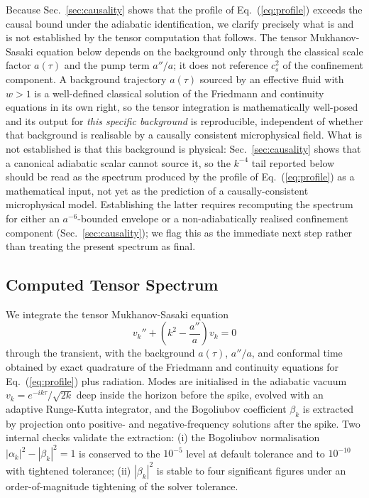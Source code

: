 \documentclass[reprint,superscriptaddress,amsmath,amssymb,aps,prd,showkeys,nofootinbib]{revtex4-2}
\begin{document}
Because Sec.~\ref{sec:causality} shows that the profile of Eq.~(\ref{eq:profile}) exceeds
the causal bound under the adiabatic identification, we clarify precisely what is and is not
established by the tensor computation that follows. The tensor Mukhanov-Sasaki equation
below depends on the background only through the classical scale factor $a(\tau)$ and the
pump term $a''/a$; it does not reference $c_s^2$ of the confinement component. A background
trajectory $a(\tau)$ sourced by an effective fluid with $w>1$ is a well-defined classical
solution of the Friedmann and continuity equations in its own right, so the tensor
integration is mathematically well-posed and its output for \emph{this specific background}
is reproducible, independent of whether that background is realisable by a causally
consistent microphysical field. What is not established is that this background is
physical: Sec.~\ref{sec:causality} shows that a canonical adiabatic scalar cannot source it,
so the $k^{-4}$ tail reported below should be read as the spectrum produced by the profile of
Eq.~(\ref{eq:profile}) as a mathematical input, not yet as the prediction of a
causally-consistent microphysical model. Establishing the latter requires recomputing the
spectrum for either an $a^{-6}$-bounded envelope or a non-adiabatically realised confinement
component (Sec.~\ref{sec:causality}); we flag this as the immediate next step rather than
treating the present spectrum as final.

\subsection{Computed Tensor Spectrum}
\label{sec:tensor}

We integrate the tensor Mukhanov-Sasaki equation
\begin{equation}
v_k'' + \left(k^2 - \frac{a''}{a}\right)v_k = 0
\end{equation}
through the transient, with the background $a(\tau)$, $a''/a$, and conformal time obtained
by exact quadrature of the Friedmann and continuity equations for
Eq.~(\ref{eq:profile}) plus radiation. Modes are initialised in the adiabatic vacuum
$v_k=e^{-ik\tau}/\sqrt{2k}$ deep inside the horizon before the spike, evolved with an
adaptive Runge-Kutta integrator, and the Bogoliubov coefficient $\beta_k$ is extracted by
projection onto positive- and negative-frequency solutions after the spike. Two internal
checks validate the extraction: (i) the Bogoliubov normalisation
$|\alpha_k|^2-|\beta_k|^2=1$ is conserved to the $10^{-5}$ level at default tolerance and
to $10^{-10}$ with tightened tolerance; (ii) $|\beta_k|^2$ is stable to four significant
figures under an order-of-magnitude tightening of the solver tolerance.
\end{document}
